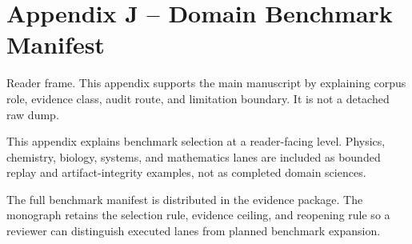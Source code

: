 \section{Appendix J -- Domain Benchmark Manifest}
Reader frame. This appendix supports the main manuscript by explaining corpus role, evidence class, audit route, and limitation boundary. It is not a detached raw dump.


\label{sec:oc-core-1-3-domain-benchmark-manifest-summary}

This appendix explains benchmark selection at a reader-facing level. Physics, chemistry, biology, systems, and mathematics lanes are included as bounded replay and artifact-integrity examples, not as completed domain sciences.


The full benchmark manifest is distributed in the evidence package. The monograph retains the selection rule, evidence ceiling, and reopening rule so a reviewer can distinguish executed lanes from planned benchmark expansion.
